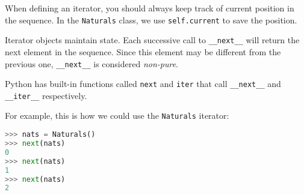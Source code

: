 When defining an iterator, you should always keep track of current position in
the sequence. In the \lstinline$Naturals$ class, we use
\lstinline$self.current$ to save the position.

Iterator objects maintain state. Each successive call to \lstinline$__next__$
will return the next element in the sequence. Since this element may be
different from the previous one, \lstinline$__next__$ is considered
\emph{non-pure}.

Python has built-in functions called \lstinline$next$ and \lstinline$iter$ that
call \lstinline$__next__$ and \lstinline$__iter__$ respectively.

For example, this is how we could use the \lstinline$Naturals$ iterator:

\begin{lstlisting}[language=Python]
>>> nats = Naturals()
>>> next(nats)
0
>>> next(nats)
1
>>> next(nats)
2
\end{lstlisting}
